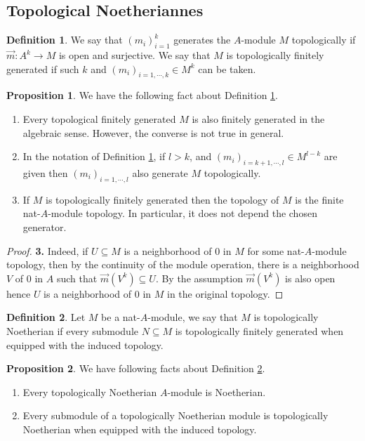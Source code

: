 \documentclass[10pt]{article}
\numberwithin{equation}{section}
\theoremstyle{definition}
\newtheorem{proposition}{Proposition}[subsection]
\newtheorem{definition}{Definition}[subsection]
\begin{document}
\subsection{Topological Noetheriannes}
\begin{definition}
    \label{definition_27_1}
    We say that $(m_i)_{i=1}^k$ generates the $A$-module $M$ topologically if $\vec{m}:A^k\to M$ is open and surjective. We say that $M$ is topologically finitely generated if such $k$ and $(m_i)_{i=1,\cdots,k}\in M^k$ can be taken.
\end{definition}

\begin{proposition}
    \label{fact_27_1}
    We have the following fact about Definition \ref{definition_27_1}.
    \begin{enumerate}[1.]
        \item Every topological finitely generated $M$ is also finitely generated in the algebraic sense. However, the converse is not true in general.
        \item In the notation of Definition \ref{definition_27_1}, if $l>k$, and $(m_i)_{i=k+1,\cdots,l}\in M^{l-k}$ are given then $(m_i)_{i=1,\cdots,l}$ also generate $M$ topologically.
        \item If $M$ is topologically finitely generated then the topology of $M$ is the finite nat-$A$-module topology. In particular, it does not depend the chosen generator.
    \end{enumerate}
\end{proposition}
\begin{proof}
    \textbf{3.} Indeed, if $U\subseteq M$ is a neighborhood of $0$ in $M$ for some nat-$A$-module topology, then by the continuity of the module operation, there is a neighborhood $V$ of $0$ in $A$ such that $\vec{m}(V^k)\subseteq U$. By the assumption $\vec{m}(V^k)$ is also open hence $U$ is a neighborhood of $0$ in $M$ in the original topology.
\end{proof}
\begin{definition}
    \label{definition_27_2}
    Let $M$ be a nat-$A$-module, we say that $M$ is topologically Noetherian if every submodule $N\subseteq M$ is topologically finitely generated when equipped with the induced topology.
\end{definition}
\begin{proposition}
    \label{fact_27_2}
    We have following facts about Definition \ref{definition_27_2}.
    \begin{enumerate}[1.]
        \item Every topologically Noetherian $A$-module is Noetherian.
        \item Every submodule of a topologically Noetherian module is topologically Noetherian when equipped with the induced topology.
    \end{enumerate}
\end{proposition}
\end{document}
